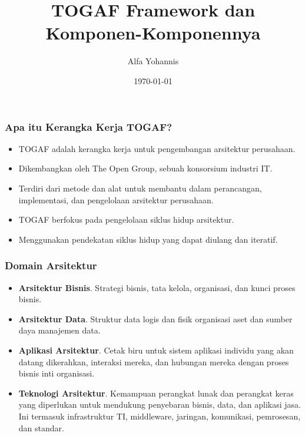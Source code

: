 \documentclass[aspectratio=169]{beamer}
\title{TOGAF Framework dan Komponen-Komponennya}
\author{Alfa Yohannis}
\date{\today}
\begin{document}
	
	\frame{\titlepage}
	
	\begin{frame}
		\frametitle{Apa itu Kerangka Kerja TOGAF?}
		\begin{itemize}
			\item TOGAF adalah kerangka kerja untuk pengembangan arsitektur perusahaan.
			\item Dikembangkan oleh The Open Group, sebuah konsorsium industri IT.
			\item Terdiri dari metode dan alat untuk membantu dalam perancangan, implementasi, dan pengelolaan arsitektur perusahaan.
			\item TOGAF berfokus pada pengelolaan siklus hidup arsitektur.
			\item Menggunakan pendekatan siklus hidup yang dapat diulang dan iteratif.
		\end{itemize}
	\end{frame}
	
	\begin{frame}
		\frametitle{Domain Arsitektur}
		\begin{itemize}
			\item \textbf{Arsitektur Bisnis}. Strategi bisnis, tata kelola, organisasi, dan kunci proses bisnis.
			
			\item \textbf{Arsitektur Data}. Struktur data logis dan fisik organisasi
			aset dan sumber daya manajemen data.
			
			\item \textbf{Aplikasi Arsitektur}. Cetak biru untuk sistem aplikasi individu yang akan datang dikerahkan, interaksi mereka, dan hubungan mereka dengan proses bisnis inti organisasi.
			
			\item \textbf{Teknologi Arsitektur}. Kemampuan perangkat lunak dan perangkat keras yang diperlukan untuk mendukung penyebaran bisnis, data, dan aplikasi jasa. Ini termasuk infrastruktur TI, middleware, jaringan, komunikasi, pemrosesan, dan standar.
		\end{itemize}
	\end{frame}
	
\end{document}
